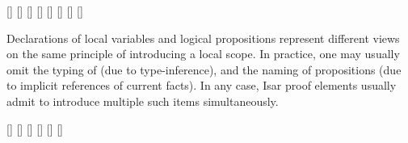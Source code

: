 \begin{isabellebody}
\begin{isamarkuptext}
  \begin{railoutput}
[]
\rail@plus
{}[]
[]
\rail@endplus
{}[]
\rail@end
{}
[]
\rail@plus
{}[]
[]
\rail@endplus
{}[]
\rail@end
\end{railoutput}


  \medskip Declarations of local variables  and
  logical propositions  represent different views on
  the same principle of introducing a local scope.  In practice, one
  may usually omit the typing of \hyperlink{syntax.vars}{\mbox{}} (due to
  type-inference), and the naming of propositions (due to implicit
  references of current facts).  In any case, Isar proof elements
  usually admit to introduce multiple such items simultaneously.

  \begin{railoutput}
\rail@plus
{}[]
\rail@endplus
\rail@bar
{}
[]
[]
\rail@endbar
\rail@end
{}
\rail@bar
{}
[]
\rail@endbar
\rail@plus
{}[]
\rail@bar
{}
[]
\rail@endbar
{}
\rail@endplus
\rail@end
\end{railoutput}



\end{isamarkuptext}
\end{isabellebody}
